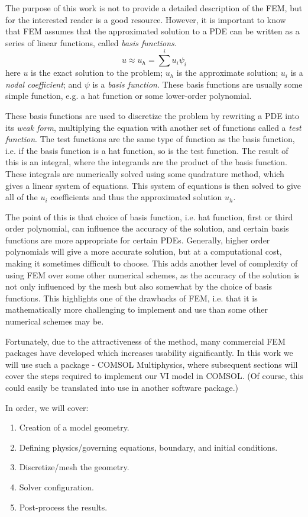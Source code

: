 The purpose of this work is not to provide a detailed description of the FEM, but for the interested reader \citeauthor{larson_finite_2010}\cite{larson_finite_2010} is a good resource.
However, it is important to know that FEM assumes that the approximated solution to a PDE can be written as a series of linear functions, called \textit{basis functions}.
\begin{equation}
  u \approx u_h = \sum^i u_i \psi_i
\end{equation}
here $u$ is the exact solution to the problem;
$u_h$ is the approximate solution;
$u_i$ is a \textit{nodal coefficient};
and $\psi$ is a \textit{basis function}.
These basis functions are usually some simple function, e.g. a hat function or some lower-order polynomial.\par

These basis functions are used to discretize the problem by rewriting a PDE into its \textit{weak form}, multiplying the equation with another set of functions called a \textit{test function}.
The test functions are the same type of function as the basis function, i.e. if the basis function is a hat function, so is the test function.
The result of this is an integral, where the integrands are the product of the basis function.
These integrals are numerically solved using some quadrature method, which gives a linear system of equations.
This system of equations is then solved to give all of the $u_i$ coefficients and thus the approximated solution $u_h$.\par

The point of this is that choice of basis function, i.e. hat function, first or third order polynomial, can influence the accuracy of the solution, and certain basis functions are more appropriate for certain PDEs.
Generally, higher order polynomials will give a more accurate solution, but at a computational cost, making it sometimes difficult to choose.
This adds another level of complexity of using FEM over some other numerical schemes, as the accuracy of the solution is not only influenced by the mesh but also somewhat by the choice of basis functions.
This highlights one of the drawbacks of FEM, i.e. that it is mathematically more challenging to implement and use than some other numerical schemes may be.\par

Fortunately, due to the attractiveness of the method, many commercial FEM packages have developed which increases usability significantly.
In this work we will use such a package - COMSOL Multiphysics, where subsequent sections will cover the steps required to implement our VI model in COMSOL.
(Of course, this could easily be translated into use in another software package.)\par

In order, we will cover:
\begin{enumerate}
  \item Creation of a model geometry.
  \item Defining physics/governing equations, boundary, and initial conditions.
  \item Discretize/mesh the geometry.
  \item Solver configuration.
  \item Post-process the results.
\end{enumerate}
